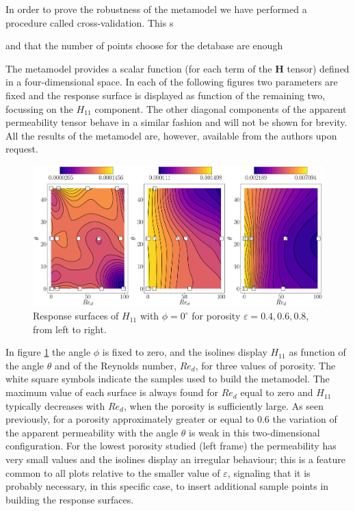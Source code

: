 In order to prove the robustness of the metamodel we have performed a procedure called cross-validation.
This s

 and that the number of points choose for the detabase are enough  



The metamodel provides a scalar function (for each term of the $\mathbf{H}$ tensor) defined in a four-dimensional space.
In each of the following figures  two parameters are fixed and the response surface is displayed as function of the remaining two, focussing on the  $H_{11}$ component. 
The other diagonal components of the apparent permeability tensor behave in a similar fashion and will not be shown for brevity. All the results of the metamodel are,
however, available from the authors upon request.


\begin{figure}[t]
	\centering
	\includegraphics[width=1\linewidth]{chapter_4/figure/krig_mater_th_re}
	\caption{Response surfaces of $H_{11}$ with $\phi=0^{\circ}$ for porosity $\varepsilon=0.4, 0.6, 0.8$, from left to right.}
	\label{fig:th_re}
\end{figure}


In figure \ref{fig:th_re} the angle $\phi$ is fixed to zero, and the isolines display $H_{11}$ as function of the angle $\theta$ and of the 
Reynolds number, $Re_d$, for three  values of porosity.  The white square symbols indicate the  samples used to build the metamodel. The maximum value of 
each surface is always found for $Re_d$ equal to zero and  $H_{11}$  typically decreases with $Re_d$, when the porosity is sufficiently large.
As seen previously, for a porosity approximately greater or equal to 0.6 the variation of the  apparent permeability with the angle $\theta$ 
is weak in this two-dimensional configuration.
For the  lowest porosity studied (left frame)  the permeability has very small values and the isolines display an irregular behaviour; this is a feature
common to all plots relative to the smaller value of $\varepsilon$, signaling that it is probably necessary, in this specific case, to insert additional sample 
points in building the response surfaces. 



